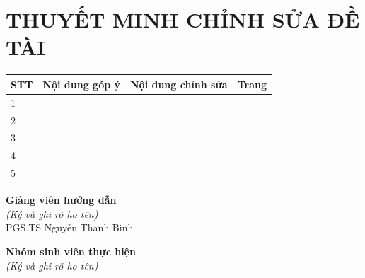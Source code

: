 \clearpage
\chapter*{\centering THUYẾT MINH CHỈNH SỬA ĐỀ TÀI}

\begin{center}
\begin{tabular}{|p{0.5cm}|p{5cm}|p{5cm}|p{3cm}|}
\hline
\textbf{STT} & \textbf{Nội dung góp ý} & \textbf{Nội dung chỉnh sửa} & \textbf{Trang} \\
\hline
1 & & & \\
\hline
2 & & & \\
\hline
3 & & & \\
\hline
4 & & & \\
\hline
5 & & & \\
\hline
\end{tabular}
\end{center}

\vspace{2cm}

\begin{minipage}[t]{0.45\textwidth}
\centering
\textbf{Giảng viên hướng dẫn}\\[0.3cm]
\textit{(Ký và ghi rõ họ tên)}\\[3cm]
PGS.TS Nguyễn Thanh Bình
\end{minipage}
\hfill
\begin{minipage}[t]{0.45\textwidth}
\centering
\textbf{Nhóm sinh viên thực hiện}\\[0.3cm]
\textit{(Ký và ghi rõ họ tên)}\\[3cm]
\end{minipage}
